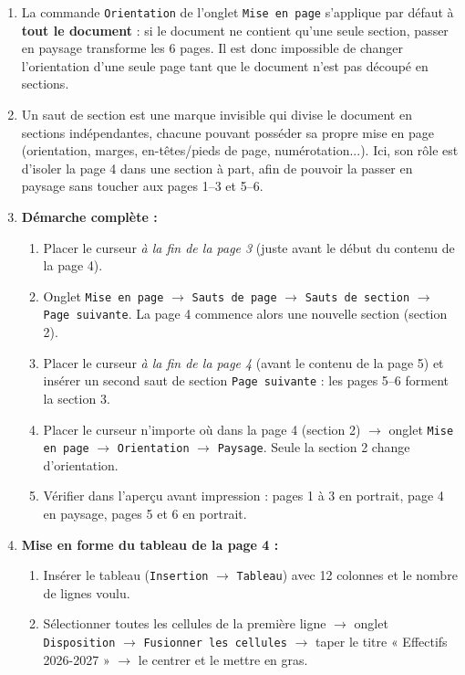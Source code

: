 \documentclass[11pt]{article}
\newcommand{\cle}[1]{{\popxbold\color{popdark}#1}}
\begin{document}
\begin{corrige}
\begin{enumerate}
\item La commande \texttt{Orientation} de l'onglet \texttt{Mise en page} s'applique par défaut à \textbf{tout le document} : si le document ne contient qu'une seule section, passer en paysage transforme les 6 pages. Il est donc impossible de changer l'orientation d'une seule page tant que le document n'est pas découpé en sections.
\item Un \cle{saut de section} est une marque invisible qui divise le document en sections indépendantes, chacune pouvant posséder sa propre mise en page (orientation, marges, en-têtes/pieds de page, numérotation...). Ici, son rôle est d'isoler la page 4 dans une section à part, afin de pouvoir la passer en paysage sans toucher aux pages 1--3 et 5--6.
\item \textbf{Démarche complète :}
\begin{enumerate}
\item Placer le curseur \emph{à la fin de la page 3} (juste avant le début du contenu de la page 4).
\item Onglet \texttt{Mise en page} $\to$ \texttt{Sauts de page} $\to$ \texttt{Sauts de section} $\to$ \texttt{Page suivante}. La page 4 commence alors une nouvelle section (section 2).
\item Placer le curseur \emph{à la fin de la page 4} (avant le contenu de la page 5) et insérer un second saut de section \texttt{Page suivante} : les pages 5--6 forment la section 3.
\item Placer le curseur n'importe où dans la page 4 (section 2) $\to$ onglet \texttt{Mise en page} $\to$ \texttt{Orientation} $\to$ \texttt{Paysage}. Seule la section 2 change d'orientation.
\item Vérifier dans l'aperçu avant impression : pages 1 à 3 en portrait, page 4 en paysage, pages 5 et 6 en portrait.
\end{enumerate}
\item \textbf{Mise en forme du tableau de la page 4 :}
\begin{enumerate}
\item Insérer le tableau (\texttt{Insertion} $\to$ \texttt{Tableau}) avec 12 colonnes et le nombre de lignes voulu.
\item Sélectionner toutes les cellules de la première ligne $\to$ onglet \texttt{Disposition} $\to$ \texttt{Fusionner les cellules} $\to$ taper le titre « Effectifs 2026-2027 » $\to$ le centrer et le mettre en gras.

\end{enumerate}
\end{enumerate}
\end{corrige}
\end{document}
